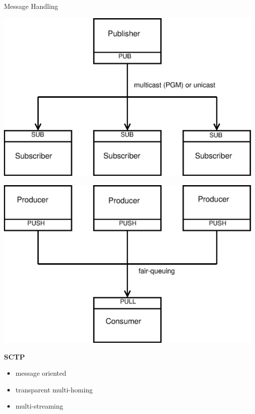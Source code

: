 \documentclass[default,pdf,colorBG,slideColor]{prosper}
\begin{document}
\begin{slide}{Message Handling}
{\begin{minipage}{0.5\textwidth}
\begin{center}
\begin{minipage}[b]{0.15\linewidth}
    \end{minipage}
    \hspace{0.2cm}
    \begin{minipage}[b]{0.3\linewidth}
    \includegraphics[scale=0.08]{comms_zmq_pubsub}
    \end{minipage}
    \hspace{0.2cm}
    \begin{minipage}[b]{0.3\linewidth}
    \includegraphics[scale=0.08]{comms_zmq_pushpull}
    \end{minipage}
  \end{center}
  \end{minipage}
  \hfill
  \begin{minipage}{0.45\textwidth}
  {\bf SCTP}
  \begin{itemize}
    \item{message oriented}
    \item{transparent multi-homing}
    \item{multi-streaming}

\end{itemize}
\end{minipage}}
\end{slide}
\end{document}

